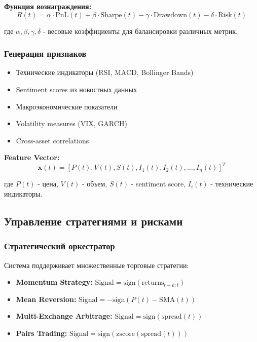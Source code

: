 \documentclass[12pt,a4paper]{article}
\begin{document}
\textbf{Функция вознаграждения:}
\begin{equation}
R(t) = \alpha \cdot \text{PnL}(t) + \beta \cdot \text{Sharpe}(t) - \gamma \cdot \text{Drawdown}(t) - \delta \cdot \text{Risk}(t)
\end{equation}

где $\alpha, \beta, \gamma, \delta$ - весовые коэффициенты для балансировки различных метрик.

\subsubsection{Генерация признаков}
\begin{itemize}
    \item Технические индикаторы (RSI, MACD, Bollinger Bands)
    \item Sentiment scores из новостных данных
    \item Макроэкономические показатели
    \item Volatility measures (VIX, GARCH)
    \item Cross-asset correlations
\end{itemize}

\textbf{Feature Vector:}
\begin{equation}
\mathbf{x}(t) = [P(t), V(t), S(t), I_1(t), I_2(t), \ldots, I_n(t)]^T
\end{equation}

где $P(t)$ - цена, $V(t)$ - объем, $S(t)$ - sentiment score, $I_i(t)$ - технические индикаторы.

\subsection{Управление стратегиями и рисками}

\subsubsection{Стратегический оркестратор}
Система поддерживает множественные торговые стратегии:

\begin{itemize}
    \item \textbf{Momentum Strategy:} $\text{Signal} = \text{sign}(\text{returns}_{t-k:t})$
    \item \textbf{Mean Reversion:} $\text{Signal} = -\text{sign}(P(t) - \text{SMA}(t))$
    \item \textbf{Multi-Exchange Arbitrage:} $\text{Signal} = \text{sign}(\text{spread}(t))$
    \item \textbf{Pairs Trading:} $\text{Signal} = \text{sign}(\text{zscore}(\text{spread}(t)))$
\end{itemize}
\end{document}
